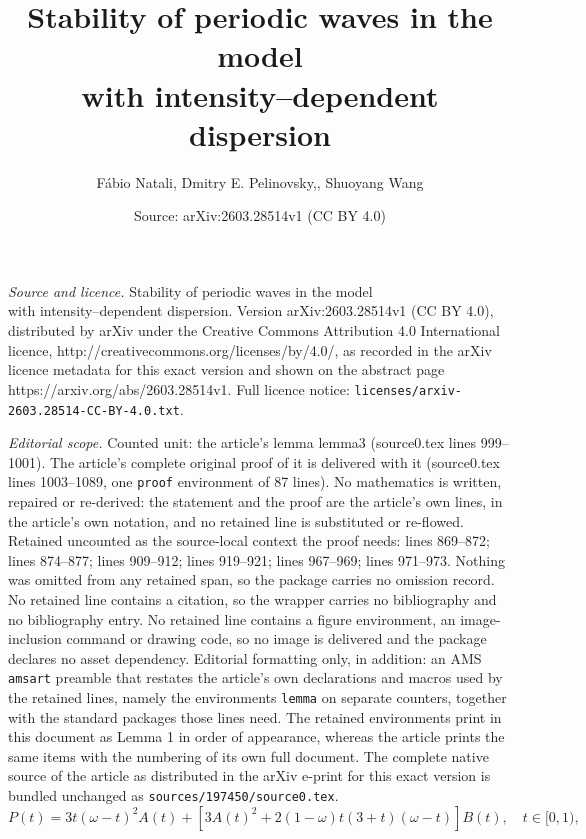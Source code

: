 \documentclass[10pt,a4paper]{amsart}
\title{Stability of periodic waves in the model \\ with intensity--dependent dispersion}
\author{F\'abio Natali, Dmitry E. Pelinovsky,, Shuoyang Wang}
\date{Source: arXiv:2603.28514v1 (CC BY 4.0)}
\begin{document}
\maketitle

\noindent\emph{Source and licence.} Stability of periodic waves in the model \\ with intensity--dependent dispersion. Version arXiv:2603.28514v1 (CC BY 4.0), distributed by arXiv under the Creative Commons Attribution 4.0 International licence, http://creativecommons.org/licenses/by/4.0/, as recorded in the arXiv licence metadata for this exact version and shown on the abstract page https://arxiv.org/abs/2603.28514v1. Full licence notice: \texttt{licenses/arxiv-2603.28514-CC-BY-4.0.txt}.\par\smallskip

\noindent\textit{Editorial scope.} Counted unit: the article's lemma lemma3 (source0.tex lines 999--1001). The article's complete original proof of it is delivered with it (source0.tex lines 1003--1089, one \texttt{proof} environment of 87 lines). No mathematics is written, repaired or re-derived: the statement and the proof are the article's own lines, in the article's own notation, and no retained line is substituted or re-flowed.  Retained uncounted as the source-local context the proof needs: lines 869--872; lines 874--877; lines 909--912; lines 919--921; lines 967--969; lines 971--973.  Nothing was omitted from any retained span, so the package carries no omission record.  No retained line contains a citation, so the wrapper carries no bibliography and no bibliography entry.  No retained line contains a figure environment, an image-inclusion command or drawing code, so no image is delivered and the package declares no asset dependency.  Editorial formatting only, in addition: an AMS \texttt{amsart} preamble that restates the article's own declarations and macros used by the retained lines, namely the environments \texttt{lemma} on separate counters, together with the standard packages those lines need.  The retained environments print in this document as Lemma 1 in order of appearance, whereas the article prints the same items with the numbering of its own full document.  The complete native source of the article as distributed in the arXiv e-print for this exact version is bundled unchanged as \texttt{sources/197450/source0.tex}.
\begin{equation}
\label{N}
P(t) = 3 t (\omega - t)^2 A(t) + \left[  3A(t)^2 +  2  (1-\omega) t (3 + t) (\omega - t)  \right ] B(t), \quad t\in [0,1),
\end{equation}
\end{document}
